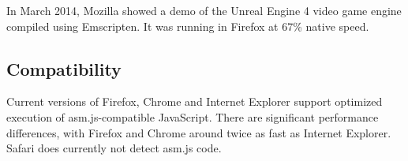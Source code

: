 In March 2014, Mozilla showed a demo of the Unreal Engine 4 video game engine compiled using Emscripten. It was running in Firefox at 67\% native speed. \cite{ue4ff}


\subsection{Compatibility}

Current versions of Firefox, Chrome and Internet Explorer support optimized execution of asm.js-compatible JavaScript. There are significant performance differences, with Firefox and Chrome around twice as fast as Internet Explorer. Safari does currently not detect asm.js code. \cite{asm.js_comp}

